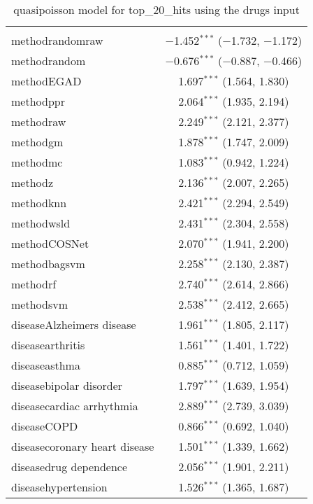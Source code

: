 
\begin{table}[!htbp] \centering 
  \caption{quasipoisson model for top_20_hits using the drugs input} 
  \label{} 
\begin{tabular}{@{\extracolsep{5pt}}lc} 
\\[-1.8ex]\hline 
\hline \\[-1.8ex] 
 methodrandomraw & $-$1.452$^{***}$ ($-$1.732, $-$1.172) \\ 
  methodrandom & $-$0.676$^{***}$ ($-$0.887, $-$0.466) \\ 
  methodEGAD & 1.697$^{***}$ (1.564, 1.830) \\ 
  methodppr & 2.064$^{***}$ (1.935, 2.194) \\ 
  methodraw & 2.249$^{***}$ (2.121, 2.377) \\ 
  methodgm & 1.878$^{***}$ (1.747, 2.009) \\ 
  methodmc & 1.083$^{***}$ (0.942, 1.224) \\ 
  methodz & 2.136$^{***}$ (2.007, 2.265) \\ 
  methodknn & 2.421$^{***}$ (2.294, 2.549) \\ 
  methodwsld & 2.431$^{***}$ (2.304, 2.558) \\ 
  methodCOSNet & 2.070$^{***}$ (1.941, 2.200) \\ 
  methodbagsvm & 2.258$^{***}$ (2.130, 2.387) \\ 
  methodrf & 2.740$^{***}$ (2.614, 2.866) \\ 
  methodsvm & 2.538$^{***}$ (2.412, 2.665) \\ 
  diseaseAlzheimers disease & 1.961$^{***}$ (1.805, 2.117) \\ 
  diseasearthritis & 1.561$^{***}$ (1.401, 1.722) \\ 
  diseaseasthma & 0.885$^{***}$ (0.712, 1.059) \\ 
  diseasebipolar disorder & 1.797$^{***}$ (1.639, 1.954) \\ 
  diseasecardiac arrhythmia & 2.889$^{***}$ (2.739, 3.039) \\ 
  diseaseCOPD & 0.866$^{***}$ (0.692, 1.040) \\ 
  diseasecoronary heart disease & 1.501$^{***}$ (1.339, 1.662) \\ 
  diseasedrug dependence & 2.056$^{***}$ (1.901, 2.211) \\ 
  diseasehypertension & 1.526$^{***}$ (1.365, 1.687) \\ 

\end{tabular}
\end{table}
